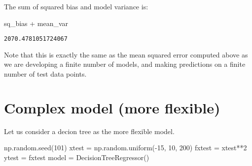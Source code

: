 \documentclass[
  letterpaper,
  DIV=11,
  numbers=noendperiod]{scrreprt}
\newenvironment{Shaded}{\begin{snugshade}}{\end{snugshade}}
\newcommand{\DecValTok}[1]{\textcolor[rgb]{0.68,0.00,0.00}{#1}}
\newcommand{\NormalTok}[1]{\textcolor[rgb]{0.00,0.23,0.31}{#1}}
\newcommand{\OperatorTok}[1]{\textcolor[rgb]{0.37,0.37,0.37}{#1}}
\begin{document}
The sum of squared bias and model variance is:

\begin{Shaded}
\begin{Highlighting}[]
\NormalTok{sq\_bias }\OperatorTok{+}\NormalTok{ mean\_var}
\end{Highlighting}
\end{Shaded}

\begin{verbatim}
2070.4781051724067
\end{verbatim}

Note that this is exactly the same as the mean squared error computed
above as we are developing a finite number of models, and making
predictions on a finite number of test data points.

\section{Complex model (more
flexible)}\label{complex-model-more-flexible}

Let us consider a decion tree as the more flexible model.

\begin{Shaded}
\begin{Highlighting}[]
\NormalTok{np.random.seed(}\DecValTok{101}\NormalTok{)}
\NormalTok{xtest }\OperatorTok{=}\NormalTok{ np.random.uniform(}\OperatorTok{{-}}\DecValTok{15}\NormalTok{, }\DecValTok{10}\NormalTok{, }\DecValTok{200}\NormalTok{)}
\NormalTok{fxtest }\OperatorTok{=}\NormalTok{ xtest}\OperatorTok{**}\DecValTok{2}
\NormalTok{ytest }\OperatorTok{=}\NormalTok{ fxtest}
\NormalTok{model }\OperatorTok{=}\NormalTok{ DecisionTreeRegressor()}
\end{Highlighting}
\end{Shaded}
\end{document}
